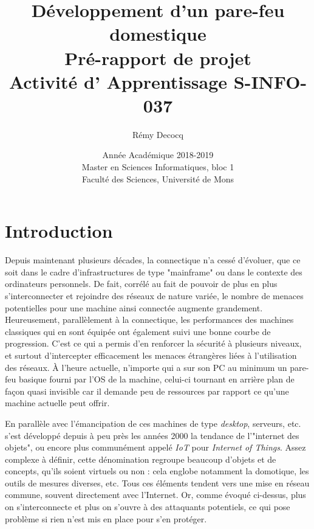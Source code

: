 \documentclass[]{article}
\begin{document}
\title{
\vspace{1.6cm}
{\Huge Développement d'un pare-feu domestique}\\
\vspace{0.5cm}
{\Huge Pré-rapport de projet}\\
{\large Activité d' Apprentissage \textsf{S-INFO-037}}\\
}
\bigskip


\author{
\vspace{0.9cm}
\huge{Rémy Decocq}
}

\date{
\vspace{9cm}
Année Académique 2018-2019\\
Master en Sciences Informatiques, bloc 1\\
Faculté des Sciences, Université de Mons}

\maketitle          

\thispagestyle{empty}   

\newpage

\tableofcontents
\newpage
\large 
\section*{Introduction}

Depuis maintenant plusieurs décades, la connectique n'a cessé d'évoluer, que ce soit dans le cadre d'infrastructures de type "mainframe" ou dans le contexte des ordinateurs personnels. De fait, corrélé au fait de pouvoir de plus en plus s'interconnecter et rejoindre des réseaux de nature variée, le nombre de menaces potentielles pour une machine ainsi connectée augmente grandement. Heureusement, parallèlement à la connectique, les performances des machines classiques qui en sont équipée ont également suivi une bonne courbe de progression. C'est ce qui a permis d'en renforcer la sécurité à plusieurs niveaux, et surtout d'intercepter efficacement les menaces étrangères liées à l'utilisation des réseaux. À l'heure actuelle, n'importe qui a sur son PC au minimum un pare-feu basique fourni par l'OS de la machine, celui-ci tournant en arrière plan de façon quasi invisible car il demande peu de ressources par rapport ce qu'une machine actuelle peut offrir.\\

\par En parallèle avec l'émancipation de ces machines de type \textit{desktop}, serveurs, etc. s'est développé depuis à peu près les années 2000 la tendance de l'"internet des objets", ou encore plus communément appelé \textit{IoT} pour \textit{Internet of Things}. Assez complexe à définir, cette dénomination regroupe beaucoup d'objets et de concepts, qu'ils soient virtuels ou non : cela englobe notamment la domotique, les outils de mesures diverses, etc. Tous ces éléments tendent vers une mise en réseau commune, souvent directement avec l'Internet. Or, comme évoqué ci-dessus, plus on s'interconnecte et plus on s'ouvre à des attaquants potentiels, ce qui pose problème si rien n'est mis en place pour s'en protéger.\\
\end{document}
